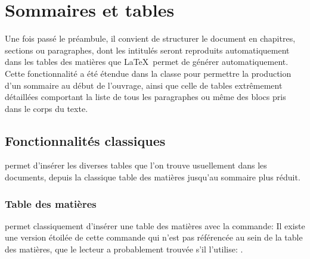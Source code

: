 



\chapter{Sommaires et tables}\label{tables-of-contents}

Une fois passé le préambule, il convient de structurer le document en chapitres, sections ou paragraphes, dont les intitulés seront reproduits automatiquement dans les tables des matières que \LaTeX\ permet de générer automatiquement. Cette fonctionnalité a été étendue dans la classe \frenchlaw pour permettre la production d'un sommaire au début de l'ouvrage, ainsi que celle de tables extrêmement détaillées comportant la liste de tous les paragraphes ou même des blocs pris dans le corps du texte.

\section{Fonctionnalités classiques}

\frenchlaw permet d'insérer les diverses tables que l'on trouve usuellement dans les documents, depuis la classique table des matières jusqu'au sommaire plus réduit. 

\subsection{Table des matières}

\frenchlaw permet classiquement d'insérer une table des matières avec la commande:  Il existe une version étoilée de cette commande qui n'est pas référencée au sein de la table des matières, que le lecteur a probablement trouvée s'il l'utilise: .



